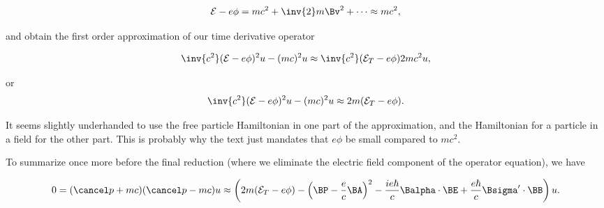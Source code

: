 \begin{equation}\label{eqn:diracGauge:440}
\mathcal{E} - e \phi = m c^2 + \inv{2} m \Bv^2 + \cdots \approx m c^2,
\end{equation}

and obtain the first order approximation of our time derivative operator

\begin{equation}\label{eqn:diracGauge:460}
\inv{c^2} ( \mathcal{E} - e \phi )^2 u - (m c)^2 u
\approx
\inv{c^2} ( \mathcal{E}_{T} - e \phi ) 2 m c^2 u,
\end{equation}

or
\begin{equation}\label{eqn:diracGauge:480}
\inv{c^2} ( \mathcal{E} - e \phi )^2 u - (m c)^2 u
\approx
2 m ( \mathcal{E}_{T} - e \phi ).
\end{equation}

It seems slightly underhanded to use the free particle Hamiltonian in one part of the approximation, and the Hamiltonian for a particle in a field for the other part.  This is probably why the text just mandates that $e\phi$ be small compared to $m c^2$.  

To summarize once more before the final reduction (where we eliminate the electric field component of the operator equation), we have

\begin{equation}\label{eqn:diracGauge:400b}
0
=
(\pslash + mc)(\pslash - mc) u
\approx
\left(
2 m ( \mathcal{E}_{T} - e \phi )
- \left(\BP - \frac{e}{c} \BA \right)^2
- \frac{i e \hbar}{c} \Balpha \cdot \BE
+ \frac{e \hbar}{c} \Bsigma' \cdot \BB
\right) u.
\end{equation}

\EndArticle
